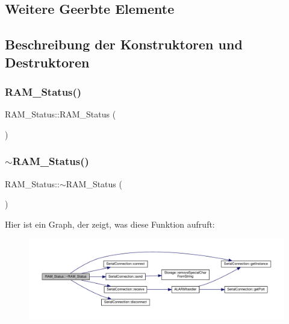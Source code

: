 \subsection*{Weitere Geerbte Elemente}


\subsection{Beschreibung der Konstruktoren und Destruktoren}
\mbox{\label{class_r_a_m___status_a66e7668bfd1949beceb2a4c3ebc2aaaa}} 
\subsubsection{R\+A\+M\+\_\+\+Status()}
{\footnotesize\ttfamily R\+A\+M\+\_\+\+Status\+::\+R\+A\+M\+\_\+\+Status (\begin{DoxyParamCaption}{ }\end{DoxyParamCaption})}

\mbox{\label{class_r_a_m___status_ae0f0b32a57c9f02553f22abd6e49fbba}} 
\subsubsection{$\sim$\+R\+A\+M\+\_\+\+Status()}
{\footnotesize\ttfamily R\+A\+M\+\_\+\+Status\+::$\sim$\+R\+A\+M\+\_\+\+Status (\begin{DoxyParamCaption}{ }\end{DoxyParamCaption})\hspace{0.3cm}{\ttfamily [virtual]}}

Hier ist ein Graph, der zeigt, was diese Funktion aufruft\+:
\nopagebreak
\begin{figure}[H]
\begin{center}
\leavevmode
\includegraphics[width=350pt]{class_r_a_m___status_ae0f0b32a57c9f02553f22abd6e49fbba_cgraph}
\end{center}
\end{figure}



